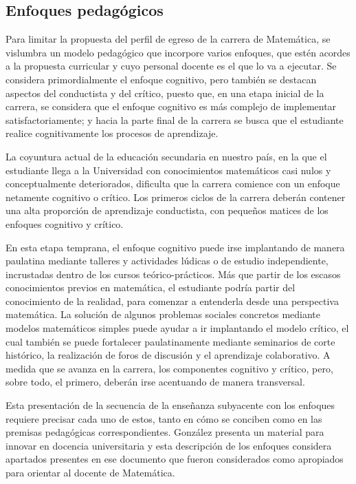 \subsection{Enfoques pedagógicos}

Para limitar la propuesta del perfil de egreso de la carrera de Matemática, se vislumbra un modelo pedagógico que incorpore varios enfoques, que estén acordes a la propuesta curricular y cuyo personal docente es el que lo va a ejecutar. Se considera primordialmente el enfoque cognitivo, pero también se destacan aspectos del conductista y del crítico, puesto que, en una etapa inicial de la carrera, se considera que el enfoque cognitivo es más complejo de implementar satisfactoriamente; y hacia la parte final de la carrera se busca que el estudiante realice cognitivamente los procesos de aprendizaje.

La coyuntura actual de la educación secundaria en nuestro país, en la que el estudiante llega a la Universidad con conocimientos matemáticos casi nulos y conceptualmente deteriorados, dificulta que la carrera comience con un enfoque netamente cognitivo o crítico. Los primeros ciclos de la carrera deberán contener una alta proporción de aprendizaje conductista, con pequeños matices de los enfoques cognitivo y crítico. 

En esta etapa temprana, el enfoque cognitivo puede irse implantando de manera paulatina mediante talleres y actividades lúdicas o de estudio independiente, incrustadas dentro de los cursos teórico-prácticos. Más que partir de los escasos conocimientos previos en matemática, el estudiante podría partir del conocimiento de la realidad, para comenzar a entenderla desde una perspectiva matemática. La solución de algunos problemas sociales concretos mediante modelos matemáticos simples puede ayudar a ir implantando el modelo crítico, el cual también se puede fortalecer paulatinamente mediante seminarios de corte histórico, la realización de foros de discusión y el aprendizaje colaborativo. A medida que se avanza en la carrera, los componentes cognitivo y crítico, pero, sobre todo, el primero, deberán irse acentuando de manera transversal. 

Esta presentación de la secuencia de la enseñanza subyacente con los enfoques requiere precisar cada uno de estos, tanto en cómo se conciben como en las premisas pedagógicas correspondientes. González \cite{Gonzalez2014} presenta un material para innovar en docencia universitaria y esta descripción de los enfoques considera apartados presentes en ese documento que fueron considerados como apropiados para orientar al docente de Matemática. 

